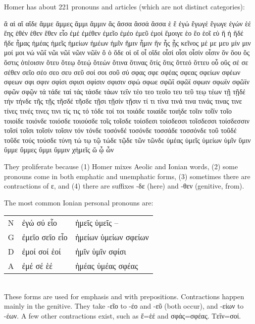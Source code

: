 \pagebreak

\begin{small}

\newcommand{\grammartablehdr}[1]{{\textcolor{gray}{\emph{#1}}}}



Homer has about 221 pronouns and articles (which are not distinct categories):


{\footnotesize 
ἅ αἱ αἵ αἵδε ἄμμε ἄμμες ἄμμι ἄμμιν ἅς ἄσσα ἅσσά ἅσσα ἑ ἕ ἐγώ ἔγωγέ ἔγωγε ἐγών ἑέ ἕης ἑθέν ἑθεν ἕθεν εἷο ἐμέ ἐμέθεν ἐμεῖο ἐμέο ἐμεῦ ἐμοί ἔμοιγε ἑο ἕο ἑοῖ εὑ ἥ ἡ ἥδέ ἥδε ἧμας ἡμέας ἡμεῖς ἡμείων ἡμέων ἡμῖν ἥμιν ἧμιν ἥν ἧς ᾗς κεῖνος μέ με μευ μίν μιν μοί μοι νώ νῶΐ νῶι νῶϊ νῶιν νῶϊν ὅ ὁ ὅδε οἱ οἵ οἷ οἵδε οἷσί οἷσι οἷσίν οἷσιν ὅν ὅου ὅς ὅστις ὁτέοισιν ὅτευ ὅτεῳ ὅτεῴ ὅτεών ὅτινα ὅτινας ὅτίς ὅτις ὅττεό ὅττευ οὗ οὕς σέ σε σέθεν σεῖο σέο σεο σευ σεῦ σοί σοι σοῦ σύ σφας σφε σφέας σφεας σφείων σφέων σφεων σφι σφιν σφίσι σφισι σφίσιν σφισιν σφώ σφωε σφῶΐ σφῶϊ σφωιν σφωϊν σφῶϊν σφῶν σφῷν τά τάδε ταί τάς τάσδε τάων τεΐν τέο τεο τεοῖο τευ τεῦ τεῳ τέων τῇ τῇδέ τήν τήνδε τῆς τῇς τῆσδέ τῆσδε τῇσι τῇσίν τῇσιν τί τι τίνα τινά τινα τινάς τινας τινε τίνες τινές τινες τινι τίς τις τό τόδε τοί τοι τοιάδε τοιαίδε τοιήδε τοῖιν τοῖϊν τοῖο τοιοίδε τοιόνδε τοιόσδε τοιούσδε τοῖς τοῖσδε τοίσδεσι τοίσδεσσι τοῖσδεσσι τοίσδεσσιν τοῖσί τοῖσι τοῖσίν τοῖσιν τόν τόνδε τοσόνδέ τοσόνδε τοσσάδε τοσσόνδε τοῦ τοῦδέ τοῦδε τούς τούσδε τύνη τώ τῳ τῷ τώδε τῷδε τῶν τῶνδε ὑμέας ὑμεῖς ὑμείων ὑμῖν ὕμιν ὔμμε ὔμμες ὔμμι ὔμμιν χἠμεῖς ὥ ᾧ ὧν
}

They proliferate because (1) Homer mixes Aeolic and Ionian words, (2) some pronouns come in both emphatic and unemphatic forms,
(3) sometimes there are contractions of ε, and (4) there are suffixes -δε (here) and -θεν (genitive, from).


The most common Ionian personal pronouns are:\\
%
\begin{tabular}{lll}
N & ἐγώ σύ εἷο     & ἡμεῖς ὑμεῖς -- \\
G & ἐμεῖο σεῖο εἷο & ἡμείων ὑμείων σφείων \\
D & ἐμοί σοί ἑοί   & ἡμῖν ὑμῖν σφίσι \\
A & ἐμέ σέ ἑέ      & ἡμέας ὑμέας σφέας
\end{tabular}\\
%
These forms are used for emphasis and with prepositions.
Contractions happen mainly in the genitive. They take -εῖο to -έο and -εῦ (both occur), and -είων to -έων.
A few other contractions exist, such as ἕ=ἑέ and σφάς=σφέας. Τεΐν=σοί. 


\end{small}
